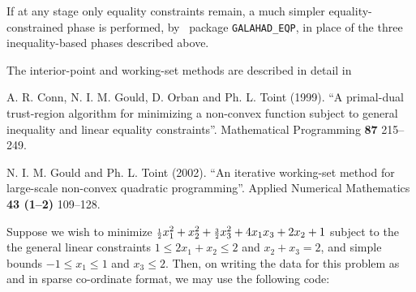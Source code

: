 \documentclass{galahad}
\begin{document}
If at any stage only equality constraints remain, a much simpler
equality-constrained phase is performed, by
\galahad\ package {\tt GALAHAD\_EQP}, in place of the 
three inequality-based phases described above.

\vspace*{1mm}

\galreferences
\vspace*{1mm}

\noindent
The interior-point and working-set methods are described in detail in
\vspace*{1mm}

\noindent
A. R. Conn, N. I. M. Gould, D. Orban and Ph. L. Toint (1999).
``A primal-dual trust-region algorithm for minimizing a non-convex 
function subject to general inequality and linear equality constraints''.
Mathematical Programming {\bf 87} 215--249.

\noindent
N. I. M. Gould and Ph. L. Toint (2002).
``An iterative working-set method 
for large-scale non-convex quadratic programming''.
Applied Numerical Mathematics
{\bf 43 (1--2)} 109--128.


\galexample
Suppose we wish to minimize
${\scriptstyle \frac{1}{2}} x_1^2 + x_2^2 + {\scriptstyle \frac{3}{2}} x_3^2 + 4 x_1 x_3 + 2 x_2 + 1$
subject to the the general linear constraints
$1 \leq  2 x_{1}  +  x_{2}  \leq  2$ and
$x_{2}  +  x_{3}  =  2$, and simple bounds
$-1  \leq  x_{1}  \leq  1$ and $x_{3}  \leq  2$.
Then, on writing the data for this problem as
and
in sparse co-ordinate format,
we may use the following code:
\end{document}
